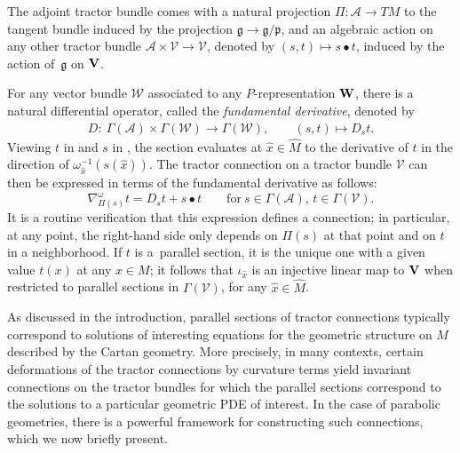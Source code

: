 \documentclass[pdftex]{sigma}
\numberwithin{equation}{section}
\theoremstyle{definition}
\def\g{{\mathfrak g}}
\def\p{{\mathfrak p}}
\begin{document}
The adjoint tractor bundle comes with a natural projection $\Pi\colon \mathcal A\rightarrow TM$ to the tangent bundle induced by the projection $\g \rightarrow \g/\p$,
and an algebraic action on any other tractor bundle $\mathcal A\times \mathcal V\rightarrow\mathcal V$, denoted by $(s,t)\mapsto s\bullet t$, induced by the action of~$\g$ on ${\bf V}$.

For any vector bundle $\mathcal W$ associated to any $P$-representation ${\bf W}$, there is a natural differential operator, called the \emph{fundamental derivative}, denoted by
 \begin{align*}
 D\colon\ \Gamma(\mathcal A)\times\Gamma(\mathcal W) \rightarrow \Gamma(\mathcal W),\qquad
(s,t) \mapsto D_st.
 \end{align*}
Viewing $t$ in  and $s$ in \smash{$C^\infty\bigl(\hat{M},\g\bigr)^P$}, the section  evaluates at $\hat{x} \in \hat{M}$ to the derivative of $t$ in the direction of $\omega_{\hat{x}}^{-1}(s(\hat{x}))$. The tractor connection on a tractor bundle $\mathcal V$ can then be expressed in terms of the fundamental derivative as follows:
\begin{equation}
\label{eqn.def.tractor.connxn}
\nabla_{\Pi(s)}^\omega t=D_st+s\bullet t\qquad \textrm{for}\ s\in \Gamma(\mathcal A),\, t\in\Gamma(\mathcal V).
\end{equation}
It is a routine verification that this expression defines a connection; in particular, at any point, the right-hand side only depends on $\Pi(s)$ at that point and on $t$ in a neighborhood. If $t$ is a~parallel section, it is the unique one with a given value $t(x)$ at any $x \in M$; it follows that $\iota_{\hat{x}}$ is an injective linear map to ${\bf V}$ when restricted to parallel sections in $\Gamma(\mathcal{V})$, for any $\hat{x} \in \hat{M}$.

As discussed in the introduction, parallel sections of tractor connections typically correspond to solutions of interesting equations for the geometric structure on $M$ described by the Cartan geometry. More precisely, in many contexts, certain deformations of the tractor connections by curvature terms yield invariant connections on the tractor bundles for which the parallel sections correspond to the solutions to a particular geometric PDE of interest.
 In the case of parabolic geometries, there is a powerful framework for constructing such connections, which we now briefly present.
\end{document}
